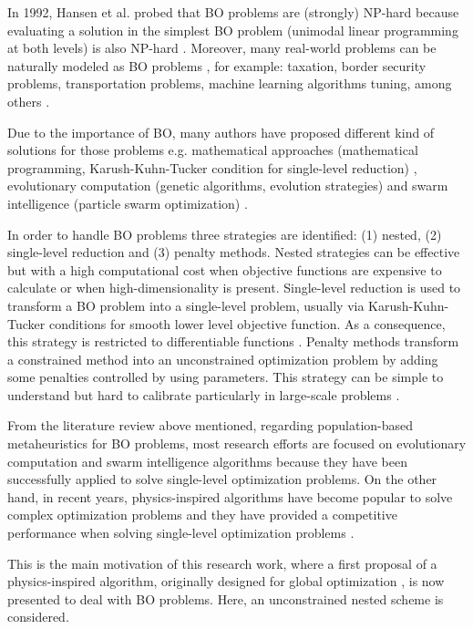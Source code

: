 \documentclass[conference]{IEEEtran}
\begin{document}
In 1992, Hansen et al. probed that BO problems are (strongly) NP-hard because 
evaluating a solution in the simplest BO problem (unimodal linear programming at
both levels) is also NP-hard \cite{hansen1992new,vicente1994descent}. Moreover,
many real-world problems can be naturally modeled as BO problems \cite{sinha2018review},
for example: taxation, border security problems, transportation problems, machine
learning algorithms tuning, among others \cite{bard2013practical,sinha2018review,arroyo2010bilevel}.

Due to the importance of BO, many authors have proposed different kind of solutions
for those problems e.g. mathematical approaches (mathematical programming,
Karush-Kuhn-Tucker condition for single-level reduction) \cite{dempe2002foundations,shi2005extended},
evolutionary computation (genetic algorithms, evolution strategies) and swarm
intelligence (particle swarm optimization) \cite{derrac2011practical,angelo2013differential,sinha2012unconstrained}.

In order to handle BO problems three strategies are identified: (1) nested,
(2) single-level reduction and (3) penalty methods. Nested strategies can be effective
but with a high computational cost when objective functions are expensive to
calculate or when high-dimensionality is present. Single-level reduction is used to
transform a BO problem into a single-level problem, usually via Karush-Kuhn-Tucker
conditions for smooth lower level objective function. As a consequence, this strategy
is restricted to differentiable functions \cite{dempe2002foundations,colson2007overview}.
Penalty methods transform a constrained method into an unconstrained optimization
problem by adding some penalties controlled by using parameters. This strategy
can be simple to understand but hard to calibrate particularly in large-scale
problems \cite{savard1994steepest,white1993penalty}.

From the literature review above mentioned, regarding population-based metaheuristics
for BO problems, most research efforts are focused on evolutionary computation and
swarm intelligence algorithms because they have been successfully applied to solve
single-level optimization problems.  On the other hand, in recent years, physics-inspired
algorithms have become popular to solve complex optimization problems and they
have provided a competitive performance when solving single-level optimization
problems \cite{fisicaSurvey}. 


This is the main motivation of this research work, where a first proposal of a
physics-inspired algorithm, originally designed for global optimization \cite{Mejia2018},
is now presented to deal with BO problems. Here, an unconstrained nested scheme
is considered.
\end{document}
